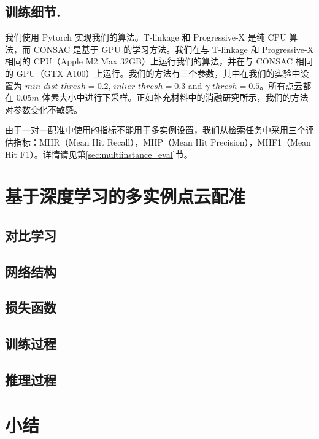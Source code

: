 \subsection{训练细节.}
我们使用 Pytorch\cite{PyTorch} 实现我们的算法。T-linkage 和 Progressive-X 是纯 CPU 算法，而 CONSAC 是基于 GPU 的学习方法。我们在与 T-linkage 和 Progressive-X 相同的 CPU（Apple M2 Max 32GB）上运行我们的算法，并在与 CONSAC 相同的 GPU（GTX A100）上运行。我们的方法有三个参数，其中在我们的实验中设置为 $min\_dist\_thresh=0.2$, $inlier\_thresh=0.3$ and $\gamma\_thresh=0.5$。所有点云都在 $0.05m$ 体素大小中进行下采样。正如补充材料中的消融研究所示，我们的方法对参数变化不敏感。

由于一对一配准中使用的指标不能用于多实例设置，我们从检索任务中采用三个评估指标：MHR（Mean Hit Recall），MHP（Mean Hit Precision），MHF1（Mean Hit F1）。详情请见第\ref{sec:multiinstance_eval}节。

\section{基于深度学习的多实例点云配准}
\subsection{对比学习}
\subsection{网络结构}
\subsection{损失函数}
\subsection{训练过程}
\subsection{推理过程}

\section{小结}
